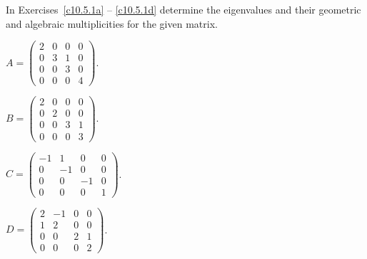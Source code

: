 \documentclass{ximera}
\begin{document}
\EXER

\TEXER

\noindent In Exercises~\ref{c10.5.1a} -- \ref{c10.5.1d} determine the 
eigenvalues and their geometric and algebraic multiplicities for the 
given matrix.
\begin{exercise} \label{c10.5.1a}
$A = \left(\begin{array}{cccc} 2 & 0 &  0 & 0\\ 0 & 3 & 1 & 0 \\
0 & 0 & 3 & 0 \\ 0 & 0 & 0 & 4 \end{array}\right)$.
\end{exercise}
\begin{exercise} \label{c10.5.1b}
$B = \left(\begin{array}{cccc} 2 & 0 &  0 & 0\\ 0 & 2 & 0 & 0 \\
0 & 0 & 3 & 1 \\ 0 & 0 & 0 & 3 \end{array}\right)$.
\end{exercise}
\begin{exercise} \label{c10.5.1c}
$C = \left(\begin{array}{rrrr} -1 & 1 &  0 & 0\\ 0 & -1 & 0 & 0 \\
0 & 0 & -1 & 0 \\ 0 & 0 & 0 & 1 \end{array}\right)$.
\end{exercise}
\begin{exercise} \label{c10.5.1d}
$D = \left(\begin{array}{rrrr} 2 & -1 &  0 & 0\\ 1 & 2 & 0 & 0 \\
0 & 0 & 2 & 1 \\ 0 & 0 & 0 & 2 \end{array}\right)$.
\end{exercise}
\end{document}
